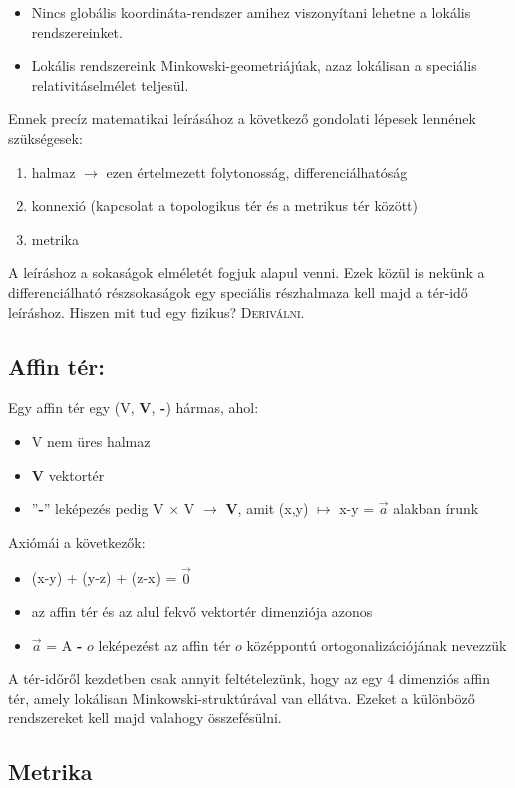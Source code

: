 \documentclass[a4paper, 12pt]{article}
\begin{document}
\begin{itemize}
\item Nincs globális koordináta-rendszer amihez viszonyítani lehetne a lokális rendszereinket.
\item Lokális rendszereink Minkowski-geometriájúak, azaz lokálisan a speciális relativitáselmélet teljesül.
\end{itemize}
\par
Ennek precíz matematikai leírásához a következő gondolati lépesek lennének szükségesek:
\begin{enumerate}
\item halmaz $\rightarrow$ ezen értelmezett folytonosság, differenciálhatóság
\item konnexió (kapcsolat a topologikus tér és a metrikus tér között)
\item metrika
\end{enumerate}
A leíráshoz a sokaságok elméletét fogjuk alapul venni. Ezek közül is nekünk a differenciálható részsokaságok egy speciális részhalmaza kell majd a tér-idő leíráshoz. Hiszen mit tud egy fizikus? \textsc{Deriválni.}
\subsection{Affin tér:}
Egy affin tér egy (V, \textbf{V}, \textbf{-}) hármas, ahol:
\begin{itemize}
\item V nem üres halmaz
\item \textbf{V} vektortér
\item ''\textbf{-}'' leképezés pedig V  $\times$ V $\rightarrow$ \textbf{V}, amit (x,y) $\mapsto$ x-y = $\vec{a}$ alakban írunk
\end{itemize}
Axiómái a következők:
\begin{itemize}
\item (x-y) + (y-z) + (z-x) = $\vec{0}$
\item az affin tér és az alul fekvő vektortér dimenziója azonos
\item $\vec{a}$ = A \textbf{-} $o$ leképezést az affin tér $o$ középpontú ortogonalizációjának nevezzük
\end{itemize}
A tér-időről kezdetben csak annyit feltételezünk, hogy az egy 4 dimenziós affin tér, amely lokálisan Minkowski-struktúrával van ellátva. Ezeket a különböző rendszereket kell majd valahogy összefésülni.
\subsection{Metrika}
\end{document}
